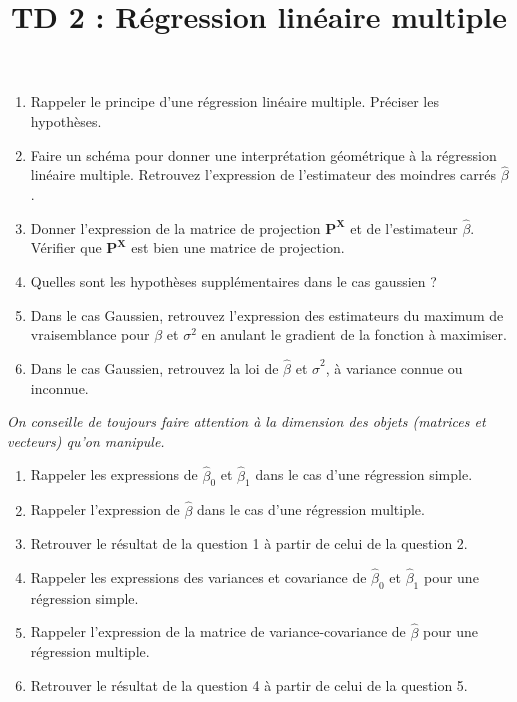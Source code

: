 \documentclass{../headers/td_upc}
\title{TD 2 : Régression linéaire multiple}
\providecommand{\1}{\mathds{1}}
\begin{document}
	\maketitle
	
	
	
	\begin{enumerate}
		\item Rappeler le principe d'une régression linéaire multiple. Préciser les hypothèses.
		\item Faire un schéma pour donner une interprétation géométrique à la régression linéaire multiple. Retrouvez l'expression de l'estimateur des moindres carrés $\hat \beta$.
		\item Donner l'expression de la matrice de projection $\mathbf{P}^{\mathbf{X}}$ et de l'estimateur $\hat \beta$. Vérifier que $\mathbf{P}^{\mathbf{X}}$ est bien une matrice de projection.
		\item Quelles sont les hypothèses supplémentaires dans le cas gaussien ?
		\item Dans le cas Gaussien, retrouvez l'expression des estimateurs du maximum de vraisemblance pour $\beta$ et $\sigma^2$ en anulant le gradient de la fonction à maximiser.
		\item Dans le cas Gaussien, retrouvez la loi de $\hat \beta$ et $\hat \sigma^2$, à variance connue ou inconnue.
	\end{enumerate}
	\textit{On conseille de toujours faire attention à la dimension des objets (matrices et vecteurs) qu'on manipule.}
	
	
	\begin{enumerate}
		\item Rappeler les expressions de $\hat \beta_0$ et $\hat \beta_1$ dans le cas d'une régression simple.
		\item Rappeler l'expression de $\hat \beta$ dans le cas d'une régression multiple.
		\item Retrouver le résultat de la question 1 à partir de celui de la question 2.
		\item Rappeler les expressions des variances et covariance de $\hat \beta_0$ et $\hat \beta_1$ pour une régression simple.
		\item Rappeler l'expression de la matrice de variance-covariance de $\hat \beta$ pour une régression multiple.
		\item Retrouver le résultat de la question 4 à partir de celui de la question 5.
	\end{enumerate}
\end{document}
